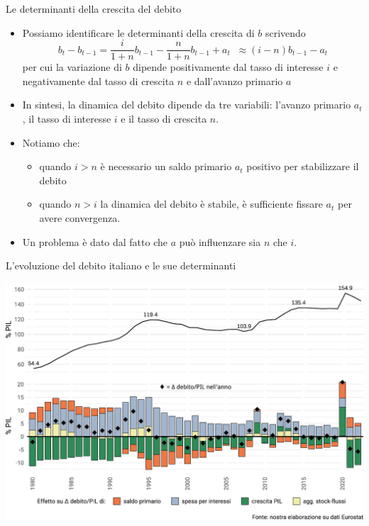 \documentclass[aspectratio=149,11pt,italian]{beamer}
\begin{document}
\begin{frame}{Le determinanti della crescita del debito}
\begin{itemize}
\item Possiamo identificare le determinanti della crescita di $b$ scrivendo
\begin{equation*}
 b_{t}-b_{t-1}=\frac{i}{1+n}b_{t-1}-\frac{n}{1+n}b_{t-1}+a_{t}
 \;\;\approx (i-n)b_{t-1}-a_{t}
\end{equation*}
per cui la variazione di $b$ dipende positivamente dal tasso di interesse
$i$ e negativamente dal tasso di crescita $n$ e dall'avanzo primario $a$
\item In sintesi, la dinamica del debito dipende da tre variabili: l'avanzo
primario $a_t$, il tasso di interesse $i$ e il tasso di crescita $n$.
\item Notiamo che:
\begin{itemize}
\item quando $i>n$ è necessario un saldo primario $a_t$ positivo per
stabilizzare il debito
\item quando $n>i$ la dinamica del debito è stabile, è sufficiente fissare $a_t$
per avere convergenza.
\end{itemize}
\item Un problema è dato dal fatto che $a$ può influenzare sia $n$ che $i$.
\end{itemize}
\end{frame}

\begin{frame}{L'evoluzione del debito italiano e le sue determinanti}
\begin{center}
\centering
\includegraphics[width=.9\textwidth]{./figure/crescita-debito-1980-2024-scomposizione-nominale-color.pdf}
\end{center}
\end{frame}
\end{document}
